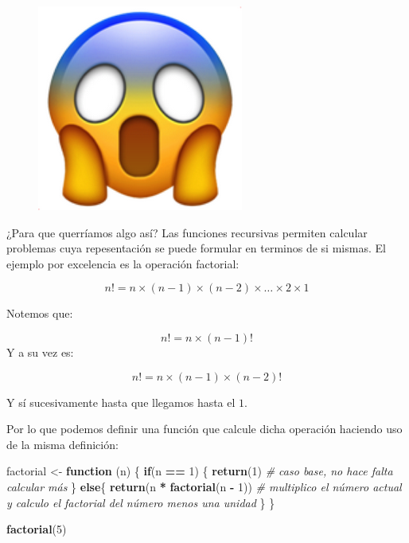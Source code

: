 \documentclass[]{book}
\newenvironment{Shaded}{\begin{snugshade}}{\end{snugshade}}
\newcommand{\KeywordTok}[1]{\textcolor[rgb]{0.13,0.29,0.53}{\textbf{#1}}}
\newcommand{\DecValTok}[1]{\textcolor[rgb]{0.00,0.00,0.81}{#1}}
\newcommand{\StringTok}[1]{\textcolor[rgb]{0.31,0.60,0.02}{#1}}
\newcommand{\CommentTok}[1]{\textcolor[rgb]{0.56,0.35,0.01}{\textit{#1}}}
\newcommand{\ControlFlowTok}[1]{\textcolor[rgb]{0.13,0.29,0.53}{\textbf{#1}}}
\newcommand{\OperatorTok}[1]{\textcolor[rgb]{0.81,0.36,0.00}{\textbf{#1}}}
\newcommand{\NormalTok}[1]{#1}
\theoremstyle{definition}
\theoremstyle{definition}
\theoremstyle{definition}
\theoremstyle{remark}
\begin{document}
\begin{figure}
\centering
\includegraphics{./imagenes/fear.png}
\caption{}
\end{figure}

¿Para que querríamos algo así? Las funciones recursivas permiten
calcular problemas cuya repesentación se puede formular en terminos de
si mismas. El ejemplo por excelencia es la operación factorial:

\[
n!=n\times(n-1)\times(n-2)\times\ldots\times2\times1
\]

Notemos que:

\[
n!=n\times(n-1)!
\] Y a su vez es:

\[
n!=n\times(n-1)\times(n-2)!
\]

Y sí sucesivamente hasta que llegamos hasta el \(1\).

Por lo que podemos definir una función que calcule dicha operación
haciendo uso de la misma definición:

\begin{Shaded}
\begin{Highlighting}[]
\NormalTok{factorial <-}\StringTok{ }\ControlFlowTok{function}\NormalTok{ (n) \{}
  \ControlFlowTok{if}\NormalTok{(n }\OperatorTok{==}\StringTok{ }\DecValTok{1}\NormalTok{) \{}
    \KeywordTok{return}\NormalTok{(}\DecValTok{1}\NormalTok{) }\CommentTok{# caso base, no hace falta calcular más}
\NormalTok{  \} }\ControlFlowTok{else}\NormalTok{\{}
    \KeywordTok{return}\NormalTok{(n }\OperatorTok{*}\StringTok{ }\KeywordTok{factorial}\NormalTok{(n }\OperatorTok{-}\StringTok{ }\DecValTok{1}\NormalTok{)) }\CommentTok{# multiplico el número actual y calculo el factorial del número menos una unidad}
\NormalTok{  \}}
\NormalTok{\}}

\KeywordTok{factorial}\NormalTok{(}\DecValTok{5}\NormalTok{)}
\end{Highlighting}
\end{Shaded}
\end{document}
